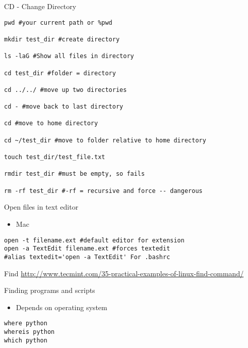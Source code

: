 \documentclass[presentation]{beamer}
\begin{document}
\begin{frame}[fragile,label=sec-3-0-5]{CD - Change Directory}
 \lstset{numbers=left,language=sh,label= ,caption= }
\begin{lstlisting}
pwd #your current path or %pwd 

mkdir test_dir #create directory

ls -laG #Show all files in directory

cd test_dir #folder = directory

cd ../../ #move up two directories

cd - #move back to last directory

cd #move to home directory

cd ~/test_dir #move to folder relative to home directory

touch test_dir/test_file.txt

rmdir test_dir #must be empty, so fails

rm -rf test_dir #-rf = recursive and force -- dangerous
\end{lstlisting}
\end{frame}


\begin{frame}[fragile,label=sec-3-0-6]{Open files in text editor}
 \begin{itemize}
\item Mac
\end{itemize}
\lstset{numbers=left,language=sh,label= ,caption= }
\begin{lstlisting}
open -t filename.ext #default editor for extension
open -a TextEdit filename.ext #forces textedit
#alias textedit='open -a TextEdit' For .bashrc
\end{lstlisting}
\end{frame}

\begin{frame}[label=sec-3-0-7]{Find}
\url{http://www.tecmint.com/35-practical-examples-of-linux-find-command/}
\end{frame}

\begin{frame}[fragile,label=sec-3-0-8]{Finding programs and scripts}
 \begin{itemize}
\item Depends on operating system
\end{itemize}

\lstset{numbers=left,language=sh,label= ,caption= }
\begin{lstlisting}
where python
whereis python
which python
\end{lstlisting}
\end{frame}
\end{document}
